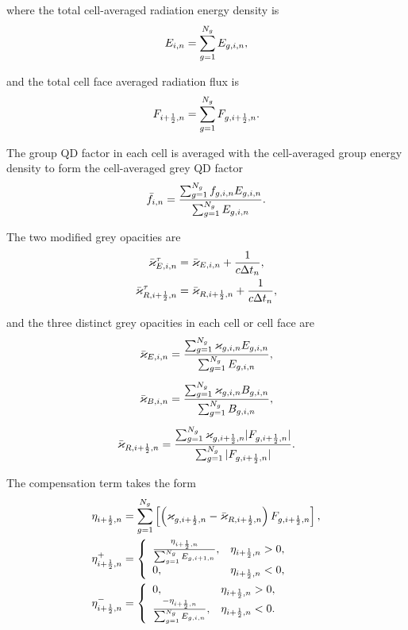 	where the total cell-averaged radiation energy density is
	\begin{equation}
		E_{i,n} = \sum_{g=1}^{N_g}E_{g,i,n},
	\end{equation}
	
	and the total cell face averaged radiation flux is
	\begin{equation}
		F_{i+\frac{1}{2},n} = \sum_{g=1}^{N_g}F_{g,i+\frac{1}{2},n}.
	\end{equation}
	
	The group QD factor in each cell is averaged with the cell-averaged group energy density to form the cell-averaged grey QD factor
	\begin{equation}
		\bar{f}_{i,n} = \frac{\sum_{g=1}^{N_g} f_{g,i,n}E_{g,i,n}}{\sum_{g=1}^{N_g} E_{g,i,n}}.
	\end{equation}
	
	The two modified grey opacities are
	\begin{gather}
		\bar{\varkappa}_{E,i,n}^\tau = \bar{\varkappa}_{E,i,n} + \frac{1}{c\Delta t_n}, \label{modkapE} \\
		\bar{\varkappa}_{R,i+\frac{1}{2},n}^\tau = \bar{\varkappa}_{R,i+\frac{1}{2},n} + \frac{1}{c\Delta t_n},
	\end{gather}
	
	and the three distinct grey opacities in each cell or cell face are
	\begin{gather}
		\bar{\varkappa}_{E,i,n} = \frac{ \sum_{g=1}^{N_g}\varkappa_{g,i,n}E_{g,i,n} }{ \sum_{g=1}^{N_g}E_{g,i,n} }, \\[5pt]
		\bar{\varkappa}_{B,i,n} = \frac{ \sum_{g=1}^{N_g}\varkappa_{g,i,n}B_{g,i,n} }{ \sum_{g=1}^{N_g}B_{g,i,n} }, \\[5pt]
		\bar{\varkappa}_{R,i+\frac{1}{2},n} = \frac{ \sum_{g=1}^{N_g}\varkappa_{g,i+\frac{1}{2},n}|F_{g,i+\frac{1}{2},n}| }{ \sum_{g=1}^{N_g}|F_{g,i+\frac{1}{2},n}| }.
	\end{gather}
	
	The compensation term takes the form
	\begin{subequations}
		\begin{align}
			&\eta_{i+\frac{1}{2},n} = \sum_{g=1}^{N_g} \left[\left(\varkappa_{g,i+\frac{1}{2},n} - \bar{\varkappa}_{R,i+\frac{1}{2},n}\right)F_{g,i+\frac{1}{2},n}\right],\\
			&\eta_{i+\frac{1}{2},n}^{+} = \left\{ \begin{array}{ll}
							\frac{\eta_{i+\frac{1}{2},n}}{\sum_{g=1}^{N_g} E_{g,i+1,n}}, & \eta_{i+\frac{1}{2},n}>0,\\
							0, & \eta_{i+\frac{1}{2},n}<0,
						\end{array} \right.\\
			&\eta_{i+\frac{1}{2},n}^{-} = \left\{ \begin{array}{ll}
							0, & \eta_{i+\frac{1}{2},n}>0,\\
							\frac{-\eta_{i+\frac{1}{2},n}}{\sum_{g=1}^{N_g} E_{g,i,n}}, & \eta_{i+\frac{1}{2},n}<0.
						\end{array} \right.
		\end{align}
	\end{subequations}
	
